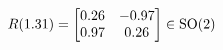 \documentclass[preview]{standalone}
\begin{document}
\begin{align*}
\special{dvisvgm:raw <g id='unique000'>}R(1.31) = \begin{bmatrix} 0.26 & -0.97 \\ 0.97 & 0.26 \end{bmatrix} \in \text{SO}(2)\special{dvisvgm:raw </g>}
\end{align*}
\end{document}
